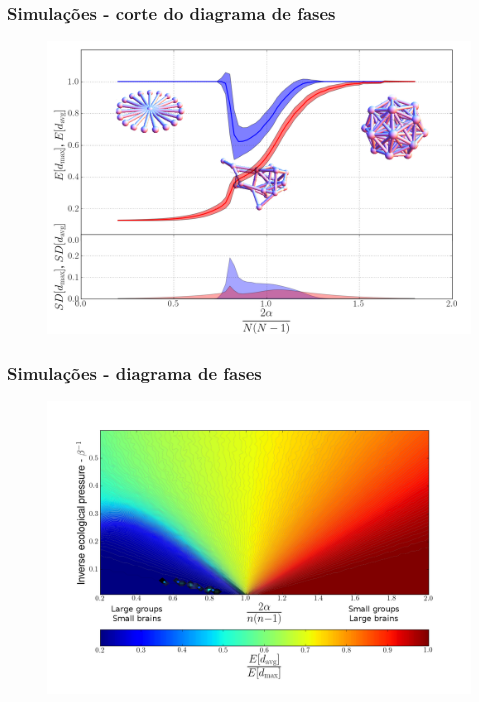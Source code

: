 \documentclass[ignorenonframetext,]{beamer}
\makeatletter
\def\ScaleIfNeededV{%
  \ifdim\Gin@nat@width>0.9\linewidth
    0.9\linewidth
  \else
    \Gin@nat@width
  \fi
}
\def\ScaleIfNeededH{%
  \ifdim\Gin@nat@height>0.9\textheight
    0.9\textheight
  \else
    \Gin@nat@height
  \fi
}
\let\Oldincludegraphics\includegraphics
\renewcommand{\includegraphics}[2][]{\Oldincludegraphics[width=\ScaleIfNeededV,height=\ScaleIfNeededH,keepaspectratio]{#2}}
\makeatother
\begin{document}
\begin{frame}\frametitle{Simulações - corte do diagrama de fases}

\begin{figure}[htbp]
\centering
\includegraphics{./figs/cutstar.png}
\end{figure}

\end{frame}

\begin{frame}\frametitle{Simulações - diagrama de fases}

\begin{figure}[htbp]
\centering
\includegraphics{./figs/phasediagram.png}
\end{figure}

\end{frame}
\end{document}
